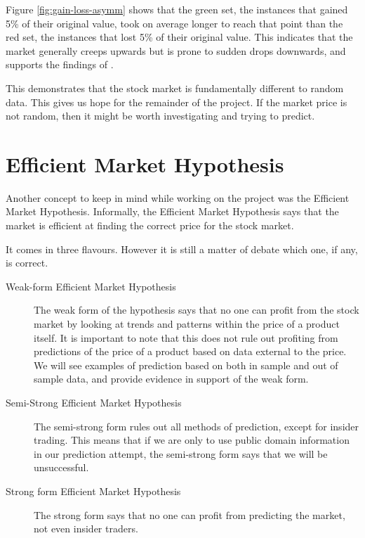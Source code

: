 \documentclass{report}
\begin{document}
Figure \ref{fig:gain-loss-asymm} shows that the green set, the instances that gained 5\% of their original value, took on average longer to reach that point than the red set, the instances that lost 5\% of their original value. This indicates that the market generally creeps upwards but is prone to sudden drops downwards, and supports the findings of \citet{karpio2007gain}.

This demonstrates that the stock market is fundamentally different to random data. This gives us hope for the remainder of the project. If the market price is not random, then it might be worth investigating and trying to predict.

\section{Efficient Market Hypothesis}

Another concept to keep in mind while working on the project was the Efficient Market Hypothesis. Informally, the Efficient Market Hypothesis says that the market is efficient at finding the correct price for the stock market.

It comes in three flavours. However it is still a matter of debate which one, if any, is correct.

\begin{description}
  \item[Weak-form Efficient Market Hypothesis] 
  The weak form of the hypothesis says that no one can profit from the stock market by looking at trends and patterns within the price of a product itself. It is important to note that this does not rule out profiting from predictions of the price of a product based on data external to the price. We will see examples of prediction based on both in sample and out of sample data, and provide evidence in support of the weak form.
  
  \item[Semi-Strong Efficient Market Hypothesis]
  The semi-strong form rules out all methods of prediction, except for insider trading. This means that if we are only to use public domain information in our prediction attempt, the semi-strong form says that we will be unsuccessful.
  
  \item[Strong form Efficient Market Hypothesis]
  The strong form says that no one can profit from predicting the market, not even insider traders.
\end{description}
\end{document}
